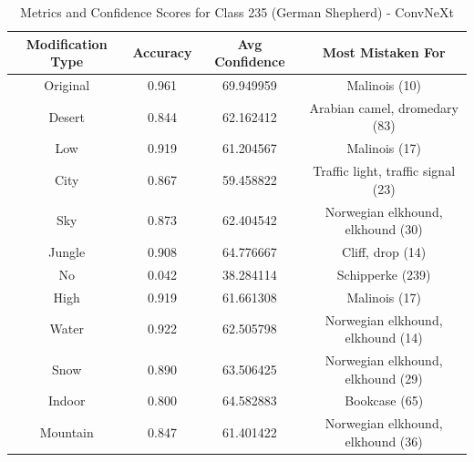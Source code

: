 \begin{table}
	\centering
	\begin{tabular}{|c|c|c|c|}
		\hline
		\textbf{Modification Type} & \textbf{Accuracy} & \textbf{Avg Confidence} & \textbf{Most Mistaken For} \\
		\hline
		Original & 0.961 & 69.949959 & Malinois (10) \\
		\hline
		Desert & 0.844 & 62.162412 & Arabian camel, dromedary (83) \\
		\hline
		Low & 0.919 & 61.204567 & Malinois (17) \\
		\hline
		City & 0.867 & 59.458822 & Traffic light, traffic signal (23) \\
		\hline
		Sky & 0.873 & 62.404542 & Norwegian elkhound, elkhound (30) \\
		\hline
		Jungle & 0.908 & 64.776667 & Cliff, drop (14) \\
		\hline
		No & 0.042 & 38.284114 & Schipperke (239) \\
		\hline
		High & 0.919 & 61.661308 & Malinois (17) \\
		\hline
		Water & 0.922 & 62.505798 & Norwegian elkhound, elkhound (14) \\
		\hline
		Snow & 0.890 & 63.506425 & Norwegian elkhound, elkhound (29) \\
		\hline
		Indoor & 0.800 & 64.582883 & Bookcase (65) \\
		\hline
		Mountain & 0.847 & 61.401422 & Norwegian elkhound, elkhound (36) \\
		\hline
	\end{tabular}
	\caption{Metrics and Confidence Scores for Class 235 (German Shepherd) - ConvNeXt}
	\label{tab:metrics_confidence_class_235_convnext}
\end{table}

